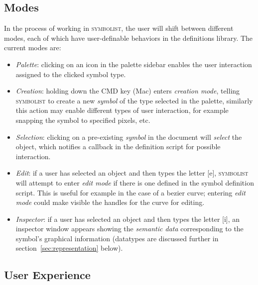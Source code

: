 \documentclass{article}
\def\symbolist{\textsc{symbolist}\xspace}
\begin{document}
\subsection{Modes}\label{sec:modes}

In the process of working in \symbolist, the user will shift between different modes, each of which have user-definable behaviors in the definitions library.
The current modes are:
\begin{itemize}\itemsep0pt 
\item \textit{Palette}: clicking on an icon in the palette sidebar enables the user interaction assigned to the clicked symbol type.
\item \textit{Creation}: holding down the CMD key (Mac) enters \textit{creation mode}, telling \symbolist to create a new \textit{symbol} of the type selected in the palette, similarly this action may enable different types of user interaction, for example snapping the symbol to specified pixels, etc.
\item \textit{Selection}: clicking on a pre-existing \textit{symbol} in the document will \textit{select} the object, which notifies a callback in the definition script for possible interaction.
\item \textit{Edit}: if a user has selected an object and then types the letter [e], \symbolist will attempt to enter \textit{edit mode} if there is one defined in the symbol definition script. This is useful for example in the case of a bezier curve; entering \textit{edit mode} could make visible the handles for the curve for editing.
\item \textit{Inspector}: if a user has selected an object and then types the letter [i], an inspector window appears showing the \textit{semantic data} corresponding to the symbol's graphical information (datatypes are discussed further in section~\ref{sec:representation} below).
\end{itemize}


\subsection{User Experience}\label{sec:ux}
\end{document}
